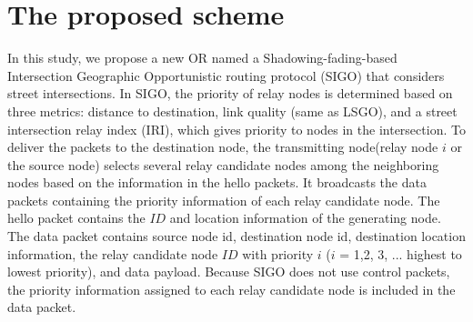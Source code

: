 \documentclass{comex}
\begin{document}
\section{The proposed scheme}
In this study, we propose a new OR named a Shadowing-fading-based Intersection Geographic Opportunistic routing protocol (SIGO) that considers street intersections. In SIGO, the priority of relay nodes is determined based on three metrics: distance to destination, link quality (same as LSGO), and a street intersection relay index (IRI), which gives priority to nodes in the intersection. To deliver the packets to the destination node, the transmitting node(relay node $i$ or the source node) selects several relay candidate nodes among the neighboring nodes based on the information in the hello packets.           
It  broadcasts the data packets containing the priority information of each relay candidate node. 
The hello packet contains the $ID$ and location information of the generating node.
The data packet contains source node id, destination node id, destination location information, the relay candidate node $ID$ with priority $i$ ($ i$ = 1,2, 3, ... highest to lowest priority), and data payload. Because SIGO does not use control packets, the priority information assigned to each relay candidate node is included in the data packet.



 
\end{document}
